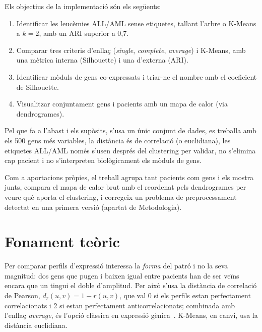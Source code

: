 \documentclass[11pt,a4paper]{article}
\begin{document}
Els objectius de la implementació són els següents:
\begin{enumerate}
  \item Identificar les leucèmies ALL/AML sense etiquetes, tallant l'arbre o K-Means a $k=2$, amb un ARI superior a 0,7.
  \item Comparar tres criteris d'enllaç (\emph{single}, \emph{complete}, \emph{average}) i K-Means, amb una mètrica interna (Silhouette) i una d'externa (ARI).
  \item Identificar mòduls de gens co-expressats i triar-ne el nombre amb el coeficient de Silhouette.
  \item Visualitzar conjuntament gens i pacients amb un mapa de calor (via dendrogrames).
\end{enumerate}
Pel que fa a l'abast i els supòsits, s'usa un únic conjunt de dades, es treballa amb els 500 gens més variables, la distància és de correlació (o euclidiana), les etiquetes ALL/AML només s'usen després del clustering per validar, no s'elimina cap pacient i no s'interpreten biològicament els mòduls de gens.

Com a aportacions pròpies, el treball agrupa tant pacients com gens i els mostra junts, compara el mapa de calor brut amb el reordenat pels dendrogrames per veure què aporta el clustering, i corregeix un problema de preprocessament detectat en una primera versió (apartat de Metodologia).

\vspace{0.4cm}
\section{Fonament teòric}

Per comparar perfils d'expressió interessa la \emph{forma} del patró i no la seva magnitud: dos gens que pugen i baixen igual entre pacients han de ser veïns encara que un tingui el doble d'amplitud. Per això s'usa la distància de correlació de Pearson, $d_r(u,v)=1-r(u,v)$, que val 0 si els perfils estan perfectament correlacionats i 2 si estan perfectament anticorrelacionats; combinada amb l'enllaç \emph{average}, és l'opció clàssica en expressió gènica~\cite{eisen}. K-Means, en canvi, usa la distància euclidiana.
\end{document}
